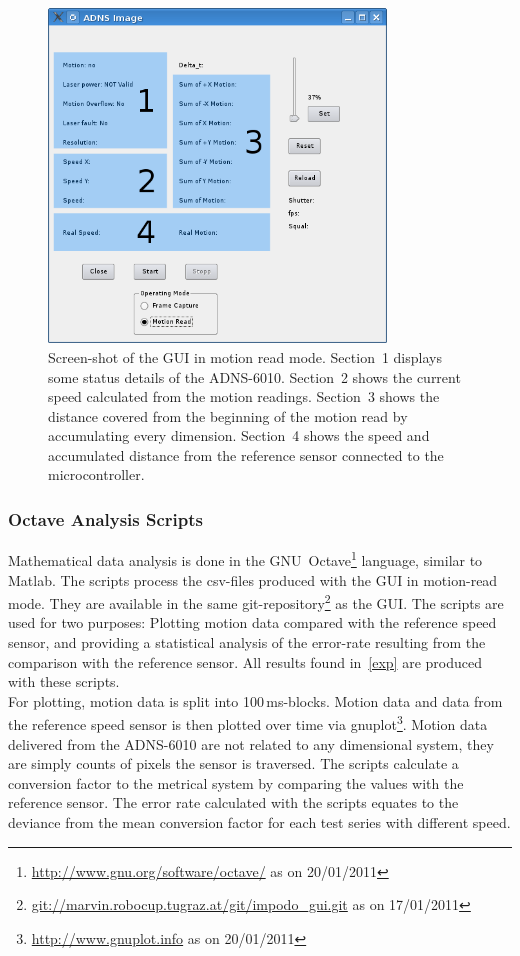 \documentclass[12pt,a4paper]{article}
\begin{document}
\begin{figure}[htbp]
\begin{center}
\includegraphics[width=0.8\textwidth]{figures/gui-motion-wtags.png}
\caption{\label{fig:gui-motion}
Screen-shot of the GUI in motion read mode.
Section~1 displays some status details of the ADNS-6010.
Section~2 shows the current speed calculated from the motion readings.
Section~3 shows the distance covered from the beginning of the motion read by accumulating every dimension.
Section~4 shows the speed and accumulated distance from the reference sensor connected to the microcontroller.
}
\end{center}
\end{figure}


\subsubsection{Octave Analysis Scripts}
\label{octave}

Mathematical data analysis is done in the GNU~Octave\footnote{\url{http://www.gnu.org/software/octave/} as on 20/01/2011} language, similar to Matlab.
The scripts process the csv-files produced with the GUI in motion-read mode.
They are available in the same git-repository\footnote{\url{git://marvin.robocup.tugraz.at/git/impodo_gui.git} as on 17/01/2011} as the GUI.
The scripts are used for two purposes: 
Plotting motion data compared with the reference speed sensor, 
and providing a statistical analysis of the error-rate resulting from the comparison with the reference sensor.
All results found in~\autoref{exp} are produced with these scripts.\\
For plotting, motion data is split into 100\,ms-blocks.
Motion data and data from the reference speed sensor is then plotted over time via gnuplot\footnote{\url{http://www.gnuplot.info} as on 20/01/2011}.
Motion data delivered from the ADNS-6010 are not related to any dimensional system, they are simply counts of pixels the sensor is traversed.
The scripts calculate a conversion factor to the metrical system by comparing the values with the reference sensor.
The error rate calculated with the scripts equates to the deviance from the mean conversion factor for each test series with different speed.
\end{document}
